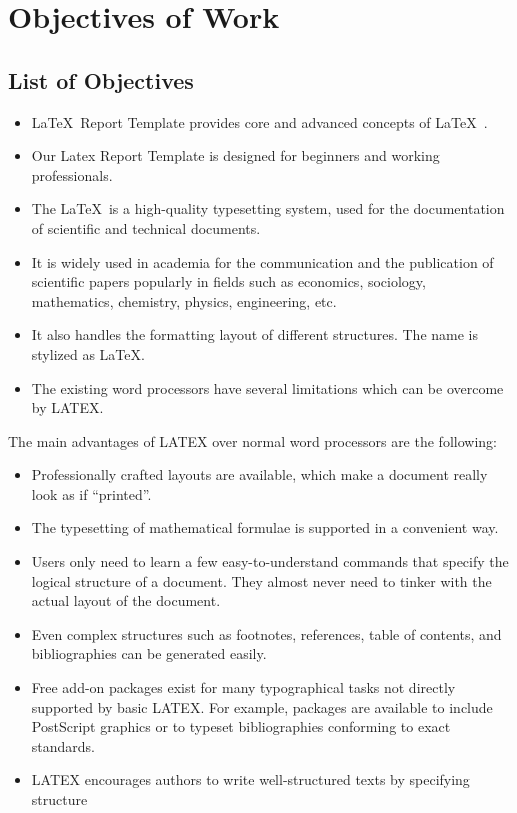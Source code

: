 \chapter{Objectives of Work}

\section{List of Objectives}

\begin{itemize}
    \item \LaTeX \ Report Template provides core and advanced concepts of \LaTeX \ .
    \item Our Latex Report Template is designed for  beginners and working professionals.
    \item The \LaTeX \ is a high-quality typesetting system, used for  the documentation of scientific and technical documents.
    \item It is widely used in academia for the  communication and the publication of scientific papers popularly in fields such as economics,  sociology, mathematics, chemistry, physics, engineering, etc.
    \item It also handles the formatting  layout of different structures. The name is stylized as \LaTeX.
    \item The existing word processors have several limitations which can be overcome by LATEX.
\end{itemize}

The main advantages of LATEX over normal word processors are the following:

\begin{itemize}
    \item Professionally crafted layouts are available, which make a document really look as if “printed”.
    \item The typesetting of mathematical formulae is supported in a convenient way.
    \item Users only need to learn a few easy-to-understand commands that specify the logical structure of a document. They almost never need to tinker with the actual layout of the document.
    \item Even complex structures such as footnotes, references, table of contents, and bibliographies can be generated easily.
    \item Free add-on packages exist for many typographical tasks not directly supported by basic LATEX. For example, packages are available to include PostScript graphics or to typeset bibliographies conforming to exact standards.
    \item LATEX encourages authors to write well-structured texts by specifying structure
\end{itemize}